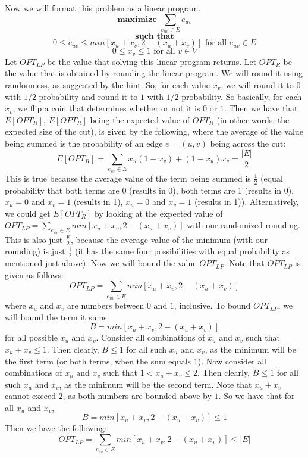 \documentclass{article}
\begin{document}
Now we will format this problem as a linear program.
\[ \textbf{maximize } \sum_{e_{uv} \in E } e_{uv}\]
\[ \textbf{such that} \]
\[ 0 \leq e_{uv} \leq min[x_u + x_v, 2 - (x_u + x_v)] \text{ for all $e_{uv} \in E$} \]
\[ 0 \leq x_v \leq 1 \text{ for all $v \in V$} \]
Let $OPT_{LP}$ be the value that solving this linear program returns. Let
$OPT_R$ be the value that is obtained by rounding the linear program.
We will round it using randomness, as suggested by
the hint. So, for each value $x_v$, we will round it to $0$ with $1/2$
probability and round it to $1$ with $1/2$ probability. So basically, for each
$x_v$, we flip a coin that determines whether or not it is $0$ or $1$. Then we
have that $E[OPT_R]$, $E[OPT_R]$ being the expected value of $OPT_R$ (in other
words, the expected size of the cut), is given
by the following, where the average of the value being summed is the probability of an edge $e
= (u,v)$ being across the cut:
\[ E[OPT_R] = \sum_{e_{uv} \in E} x_u(1 - x_v) + (1 - x_u)x_v = \frac{|E|}{2} \]
This is true because the average value of the term being summed is
$\frac{1}{2}$ (equal probability that both terms are 0 (results in 0), both terms are
1 (results in 0), $x_u = 0$ and $x_v = 1$ (results in 1), $x_u = 0$ and $x_v = 1$
(results in 1)). Alternatively, we could get $E[OPT_R]$ by looking at the
expected value of $OPT_{LP} = \sum_{e_{uv} \in E} min[x_u + x_v, 2 - (x_u +
x_v)]$ with our randomized rounding. This is also just $\frac{E}{2}$, because
the average value of the minimum (with our rounding) is just $\frac{1}{2}$ (it
has the same four possibilities with equal probability as mentioned just above).
Now we will bound the value $OPT_{LP}$. Note that $OPT_{LP}$ is given as
follows:
\[ OPT_{LP} = \sum_{e_{uv} \in E} min[x_u + x_v, 2 - (x_u + x_v)] \]
where $x_u$ and $x_v$ are numbers between $0$ and $1$, inclusive. To bound
$OPT_{LP}$, we will bound the term it sums:
\[ B = min[x_u + x_v, 2 - (x_u + x_v)] \]
for all possible $x_u$ and $x_v$. Consider all combinations of $x_u$ and $x_v$
such that $x_u + x_v \leq 1$. Then clearly, $B \leq 1$ for all such $x_u$ and
$x_v$, as the minimum will be the first term (or both terms, when the sum equals
1). Now consider all combinations of $x_u$ and $x_v$ such that $1 < x_u + x_v
\leq 2$. Then clearly, $B \leq 1$ for all such $x_u$ and $x_v$, as the minimum
will be the second term. Note that $x_u + x_v$ cannot exceed $2$, as both
numbers are bounded above by $1$. So we have that for all $x_u$ and $x_v$,
\[ B = min[x_u + x_v, 2 - (x_u + x_v)] \leq 1 \]
Then we have the following:
\[ OPT_{LP} = \sum_{e_{uv} \in E} min[x_u + x_v, 2 - (x_u + x_v)] \leq |E| \]
\end{document}

